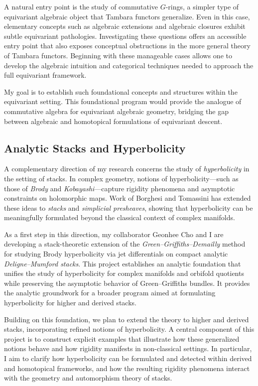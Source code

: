 \documentclass[11pt]{article}
\begin{document}
A natural entry point is the study of commutative $G$-rings, a simpler type of equivariant algebraic object that Tambara functors generalize.
Even in this case, elementary concepts such as algebraic extensions and algebraic closures exhibit subtle equivariant pathologies.
Investigating these questions offers an accessible entry point that also exposes conceptual obstructions in the more general theory of Tambara functors.
Beginning with these manageable cases allows one to develop the algebraic intuition and categorical techniques needed to approach the full equivariant framework.

My goal is to establish such foundational concepts and structures within the equivariant setting.
This foundational program would provide the analogue of commutative algebra for equivariant algebraic geometry, bridging the gap between algebraic and homotopical formulations of equivariant descent.


\subsection*{Analytic Stacks and Hyperbolicity}
A complementary direction of my research concerns the study of {\it hyperbolicity} in the setting of stacks.
In complex geometry, notions of hyperbolicity—such as those of {\it Brody} and {\it Kobayashi}—capture rigidity phenomena and asymptotic constraints on holomorphic maps.
Work of Borghesi and Tomassini \cite{MR3673667} has extended these ideas to {\it stacks} and {\it simplicial presheaves}, showing that hyperbolicity can be meaningfully formulated beyond the classical context of complex manifolds.

As a first step in this direction, my collaborator Geonhee Cho and I are developing a stack-theoretic extension of the {\it Green–Griffiths–Demailly} method for studying Brody hyperbolicity via jet differentials on compact analytic {\it Deligne–Mumford stacks}.
This project establishes an analytic foundation that unifies the study of hyperbolicity for complex manifolds and orbifold quotients while preserving the asymptotic behavior of Green–Griffiths bundles.
It provides the analytic groundwork for a broader program aimed at formulating hyperbolicity for higher and derived stacks.

Building on this foundation, we plan to extend the theory to higher and derived stacks, incorporating refined notions of hyperbolicity.
A central component of this project is to construct explicit examples that illustrate how these generalized notions behave and how rigidity manifests in non-classical settings.
In particular, I aim to clarify how hyperbolicity can be formulated and detected within derived and homotopical frameworks, and how the resulting rigidity phenomena interact with the geometry and automorphism theory of stacks.
\end{document}
